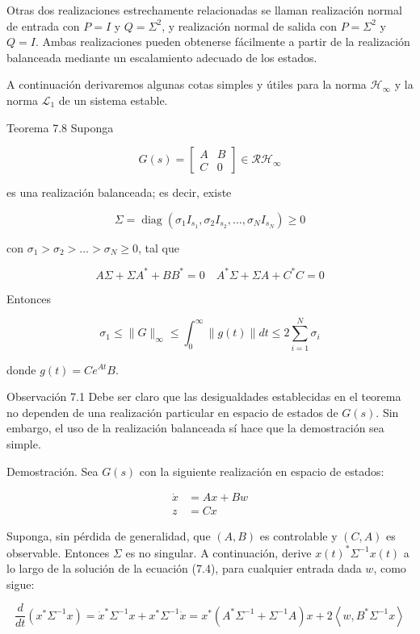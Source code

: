 Otras dos realizaciones estrechamente relacionadas se llaman realización normal de entrada con $P=I$ y $Q=\Sigma^{2}$, y realización normal de salida con $P=\Sigma^{2}$ y $Q=I$. Ambas realizaciones pueden obtenerse fácilmente a partir de la realización balanceada mediante un escalamiento adecuado de los estados.

A continuación derivaremos algunas cotas simples y útiles para la norma $\mathcal{H}_{\infty}$ y la norma $\mathcal{L}_{1}$ de un sistema estable.

Teorema 7.8 Suponga

$$
G(s)=\left[\begin{array}{c|c}
A & B \\
\hline C & 0
\end{array}\right] \in \mathcal{R} \mathcal{H}_{\infty}
$$

es una realización balanceada; es decir, existe

$$
\Sigma=\operatorname{diag}\left(\sigma_{1} I_{s_{1}}, \sigma_{2} I_{s_{2}}, \ldots, \sigma_{N} I_{s_{N}}\right) \geq 0
$$

con $\sigma_{1}>\sigma_{2}>\ldots>\sigma_{N} \geq 0$, tal que

$$
A \Sigma+\Sigma A^{*}+B B^{*}=0 \quad A^{*} \Sigma+\Sigma A+C^{*} C=0
$$

Entonces

$$
\sigma_{1} \leq\|G\|_{\infty} \leq \int_{0}^{\infty}\|g(t)\| d t \leq 2 \sum_{i=1}^{N} \sigma_{i}
$$

donde $g(t)=C e^{A t} B$.

Observación 7.1 Debe ser claro que las desigualdades establecidas en el teorema no dependen de una realización particular en espacio de estados de $G(s)$. Sin embargo, el uso de la realización balanceada sí hace que la demostración sea simple.

Demostración. Sea $G(s)$ con la siguiente realización en espacio de estados:


\begin{align*}
\dot{x} & =A x+B w \\
z & =C x \tag{7.4}
\end{align*}


Suponga, sin pérdida de generalidad, que $(A, B)$ es controlable y $(C, A)$ es observable. Entonces $\Sigma$ es no singular. A continuación, derive $x(t)^{*} \Sigma^{-1} x(t)$ a lo largo de la solución de la ecuación (7.4), para cualquier entrada dada $w$, como sigue:

$$
\frac{d}{d t}\left(x^{*} \Sigma^{-1} x\right)=\dot{x}^{*} \Sigma^{-1} x+x^{*} \Sigma^{-1} \dot{x}=x^{*}\left(A^{*} \Sigma^{-1}+\Sigma^{-1} A\right) x+2\left\langle w, B^{*} \Sigma^{-1} x\right\rangle
$$

